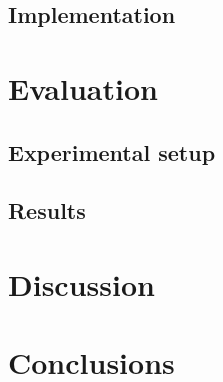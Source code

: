 \documentclass[12pt,english]{article}
\begin{document}
\subsection{Implementation}


\section{Evaluation}

\subsection{Experimental setup}

\subsection{Results}


\section{Discussion}

\section{Conclusions}


\newpage


\end{document}
